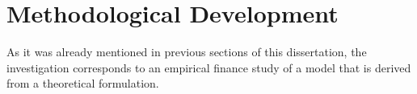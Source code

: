 \chapter{Methodological Development}
\label{c4}
As it was already mentioned in previous sections of this dissertation, the investigation corresponds to an empirical finance study of a model that is derived from a theoretical formulation.